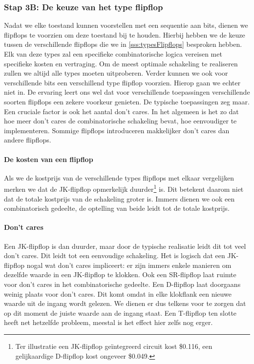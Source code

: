 \subsubsection{Stap 3B: De keuze van het type flipflop}
Nadat we elke toestand kunnen voorstellen met een sequentie aan bits, dienen we flipflops te voorzien om deze toestand bij te houden. Hierbij hebben we de keuze tussen de verschillende flipflops die we in \ref{sss:typesFlipflops} besproken hebben. Elk van deze types zal een specifieke combinatorische logica vereisen met specifieke kosten en vertraging. Om de meest optimale schakeling te realiseren zullen we altijd alle types moeten uitproberen. Verder kunnen we ook voor verschillende bits een verschillend type flipflop voorzien. Hierop gaan we echter niet in. De ervaring leert ons wel dat voor verschillende toepassingen verschillende soorten flipflops een zekere voorkeur genieten. De typische toepassingen zeg maar. Een cruciale factor is ook het aantal don't cares. In het algemeen is het zo dat hoe meer don't cares de combinatorische schakeling bevat, hoe eenvoudiger te implementeren. Sommige flipflops introduceren makkelijker don't cares dan andere flipflops.
\paragraph{De kosten van een flipflop}Als we de kostprijs van de verschillende types flipflops met elkaar vergelijken merken we dat de JK-flipflop opmerkelijk duurder\footnote{Ter illustratie een JK-flipflop ge\"integreerd circuit kost \$0.116, een gelijkaardige D-flipflop kost ongeveer \$0.049.} is. Dit betekent daarom niet dat de totale kostprijs van de schakeling groter is. Immers dienen we ook een combinatorisch gedeelte, de optelling van beide leidt tot de totale kostprijs.
\paragraph{Don't cares}Een JK-flipflop is dan duurder, maar door de typische realisatie leidt dit tot veel don't cares. Dit leidt tot een eenvoudige schakeling. Het is logisch dat een JK-flipflop nogal wat don't cares impliceert: er zijn immers enkele manieren om dezelfde waarde in een JK-flipflop te klokken. Ook een SR-flipflop laat ruimte voor don't cares in het combinatorische gedeelte. Een D-flipflop laat doorgaans weinig plaats voor don't cares. Dit komt omdat in elke klokflank een nieuwe waarde uit de ingang wordt gelezen. We dienen er dus telkens voor te zorgen dat op dit moment de juiste waarde aan de ingang staat. Een T-flipflop ten slotte heeft net hetzelfde probleem, meestal is het effect hier zelfs nog erger.
